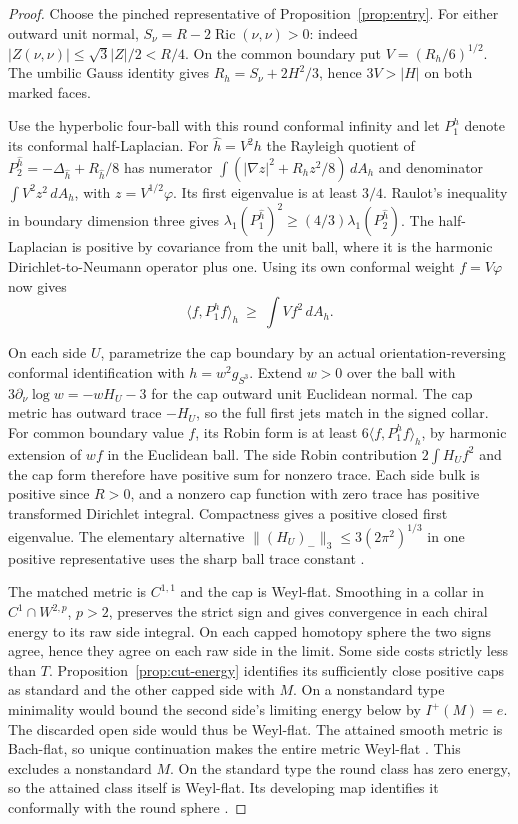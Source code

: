 \documentclass[11pt,letterpaper]{article}
\numberwithin{equation}{section}
\DeclareMathOperator{\Ric}{Ric}
\begin{document}
\begin{proof}
Choose the pinched representative of Proposition~\ref{prop:entry}.
For either outward unit normal, \(S_\nu=R-2\Ric(\nu,\nu)>0\):
indeed \(|Z(\nu,\nu)|\le\sqrt{3}|Z|/2<R/4\).
On the common boundary put \(V=(R_h/6)^{1/2}\).
The umbilic Gauss identity gives \(R_h=S_\nu+2H^2/3\), hence
\(3V>|H|\) on both marked faces.

Use the hyperbolic four-ball with this round conformal infinity and let
\(P_1^h\) denote its conformal half-Laplacian. For
\(\widehat h=V^2h\) the Rayleigh quotient of
\(P_2^{\widehat h}=-\Delta_{\widehat h}+R_{\widehat h}/8\)
has numerator \(\int(|\nabla z|^2+R_hz^2/8)\,dA_h\) and denominator
\(\int V^2z^2\,dA_h\), with \(z=V^{1/2}\varphi\).
Its first eigenvalue is at least \(3/4\).
Raulot's inequality in boundary dimension three
\cite[Theorem 3.1]{Raulot2019ScalarFlat} gives
\(\lambda_1(P_1^{\widehat h})^2\ge(4/3)\lambda_1(P_2^{\widehat h})\).
The half-Laplacian is positive by covariance from the unit ball,
where it is the harmonic Dirichlet-to-Neumann operator plus one.
Using its own conformal weight \(f=V\varphi\) now gives
\[
  \langle f,P_1^h f\rangle_h\ \ge\ \int V f^2\,dA_h .
\]

On each side \(U\), parametrize the cap boundary by an actual
orientation-reversing conformal identification with \(h=w^2g_{S^3}\).
Extend \(w>0\) over the ball with \(3\partial_\nu\log w=-wH_U-3\)
for the cap outward unit Euclidean normal. The cap metric has outward
trace \(-H_U\), so the full first jets match in the signed collar.
For common boundary value \(f\), its Robin form is at least
\(6\langle f,P_1^h f\rangle_h\), by harmonic extension of \(wf\)
in the Euclidean ball. The side Robin contribution \(2\int H_Uf^2\)
and the cap form therefore have positive sum for nonzero trace.
Each side bulk is positive since \(R>0\), and a nonzero cap function
with zero trace has positive transformed Dirichlet integral.
Compactness gives a positive closed first eigenvalue.
The elementary alternative
\(\|(H_U)_-\|_3\le3(2\pi^2)^{1/3}\) in one positive representative
uses the sharp ball trace constant \cite[Theorem 1.1]{NgoNguyenPhan2020Trace}.

The matched metric is \(C^{1,1}\) and the cap is Weyl-flat.
Smoothing in a collar in \(C^1\cap W^{2,p}\), \(p>2\), preserves the
strict sign and gives convergence in each chiral energy to its raw
side integral. On each capped homotopy sphere the two signs agree,
hence they agree on each raw side in the limit. Some side costs
strictly less than \(T\). Proposition~\ref{prop:cut-energy}
identifies its sufficiently close positive caps as standard and the
other capped side with \(M\). On a nonstandard type minimality would
bound the second side's limiting energy below by \(I^+(M)=e\).
The discarded open side would thus be Weyl-flat. The attained
smooth metric is Bach-flat, so unique continuation makes the
entire metric Weyl-flat \cite[Theorem 3.8]{LassasLiimatainen2019ConformalHarmonic}.
This excludes a nonstandard \(M\). On the standard type the round class
has zero energy, so the attained class itself is Weyl-flat. Its developing
map identifies it conformally with the round sphere \cite{Kuiper1949}.
\end{proof}
\end{document}
